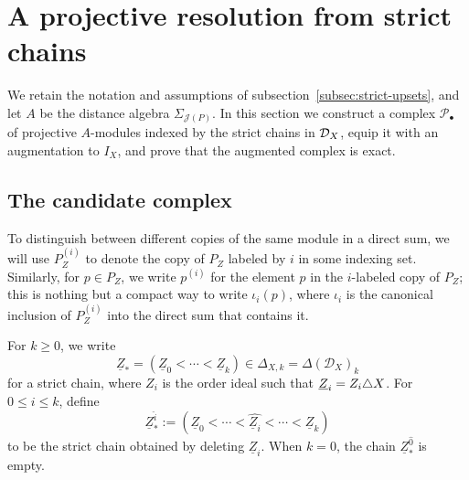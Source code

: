 \documentclass[a4paper,leqno]{amsart}
\begin{document}

\section{A projective resolution from strict chains}
\label{sec:candidate-resolution}

We retain the notation and assumptions of subsection~\ref{subsec:strict-upsets}, and let $A$ be the distance algebra $\Sigma_{\mathcal{J}(P)}$.
In this section we construct a complex $\mathcal P_\bullet$ of projective $A$-modules indexed by the strict chains in $\mathcal D_X$, equip it with an augmentation to $I_X$, and prove that the augmented complex is exact.

\subsection{The candidate complex}

To distinguish between different copies of the same module in a direct sum, we will use $P_Z^{(i)}$ to denote the copy of $P_Z$ labeled by $i$ in some indexing set.  Similarly, for $p\in P_Z$, we write $p^{(i)}$ for the element $p$ in the $i$-labeled copy of $P_Z$; this is nothing but a compact way to write $\iota_i(p)$, where $\iota_i$ is the canonical inclusion of $P_Z^{(i)}$ into the direct sum that contains it.

For $k\geq0$, we write
\[
 \underline{Z}_\ast=(\underline{Z}_0<\cdots<\underline{Z}_k)
 \in\Delta_{X,k}=\Delta(\mathcal D_X)_k
\]
for a strict chain, where $Z_i$ is the order ideal such that $\underline{Z}_i = Z_i {\mathbin{\triangle}} X$. For $0\leq i\leq k$, define
\[
 \underline{Z}_\ast^{\widehat{i}}
 :=(\underline{Z}_0<\cdots<\widehat{\underline{Z}_i}<\cdots<\underline{Z}_k)
\]
to be the strict chain obtained by deleting $\underline{Z}_i$. When $k=0$, the chain $\underline{Z}_\ast^{\widehat{0}}$ is empty.
\end{document}
